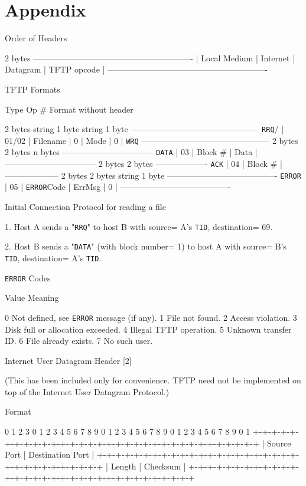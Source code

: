 \documentclass[12pt]{article}
\begin{document}
\section{Appendix}
  Order of Headers
  
                           2 bytes
    ----------------------------------------------------------
   | Local Medium | Internet | Datagram | TFTP opcode |
    ----------------------------------------------------------
  
  TFTP Formats
  
   Type  Op \#   Format without header
  
       2 bytes  string  1 byte   string  1 byte
       -----------------------------------------------
   \verb|RRQ|/ | 01/02 | Filename |  0 |  Mode  |  0 |
   \verb|WRQ|  -----------------------------------------------
       2 bytes  2 bytes    n bytes
       ---------------------------------
   \verb|DATA| | 03  |  Block \# |  Data  |
       ---------------------------------
       2 bytes  2 bytes
       -------------------
   \verb|ACK|  | 04  |  Block \# |
       --------------------
       2 bytes 2 bytes    string  1 byte
       ----------------------------------------
    \verb|ERROR| | 05  |  \verb|ERROR|Code |  ErrMsg  |  0 |
       ----------------------------------------
  
  Initial Connection Protocol for reading a file
  
   1. Host A sends a "\verb|RRQ|" to host B with source= A's \verb|TID|,
     destination= 69.
  
   2. Host B sends a "\verb|DATA|" (with block number= 1) to host A with
     source= B's \verb|TID|, destination= A's \verb|TID|.
  
   \verb|ERROR| Codes
  
   Value   Meaning
  
   0     Not defined, see  \verb|ERROR| message (if any).
   1     File not found.
   2     Access violation.
   3     Disk full or allocation exceeded.
   4     Illegal TFTP operation.
   5     Unknown transfer ID.
   6     File already exists.
   7     No such user.
  
  Internet User Datagram Header [2]
  
   (This has been included only for convenience. TFTP need not be
   implemented on top of the Internet User Datagram Protocol.)
  
    Format
  
    0          1          2          3
    0 1 2 3 4 5 6 7 8 9 0 1 2 3 4 5 6 7 8 9 0 1 2 3 4 5 6 7 8 9 0 1
   +-+-+-+-+-+-+-+-+-+-+-+-+-+-+-+-+-+-+-+-+-+-+-+-+-+-+-+-+-+-+-+-+
   |     Source Port     |    Destination Port    |
   +-+-+-+-+-+-+-+-+-+-+-+-+-+-+-+-+-+-+-+-+-+-+-+-+-+-+-+-+-+-+-+-+
   |      Length       |      Checksum      |
   +-+-+-+-+-+-+-+-+-+-+-+-+-+-+-+-+-+-+-+-+-+-+-+-+-+-+-+-+-+-+-+-+
  
\end{document}
